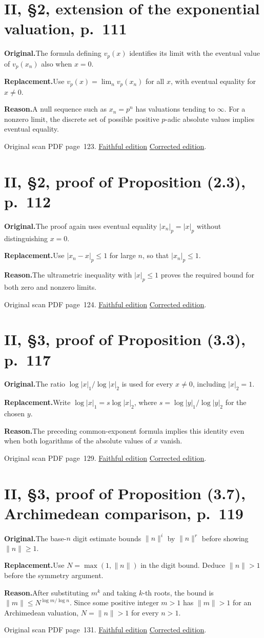 \documentclass[11pt,a4paper]{article}
\newcommand{\original}{\par\smallskip\noindent\textbf{Original.}\enspace}
\newcommand{\replacement}{\par\smallskip\noindent\textbf{Replacement.}\enspace}
\newcommand{\reason}{\par\smallskip\noindent\textbf{Reason.}\enspace}
\newcommand{\editionlink}[3]{\href{#1\#errata.#2}{#3}}
\newcommand{\location}[2]{%
  \par\smallskip\noindent Original scan PDF page~#2.\enspace
  \editionlink{Neukirch_Faithful.pdf}{#1}{Faithful edition}
  \quad\editionlink{Neukirch_Corrected.pdf}{#1}{Corrected edition}.}
\begin{document}
\section{II, \S2, extension of the exponential valuation, p.~111}\label{errata:item:72}

\original The formula defining $v_p(x)$ identifies its limit with the eventual value of $v_p(x_n)$ also when $x=0$.
\replacement Use $v_p(x)=\lim_n v_p(x_n)$ for all $x$, with eventual equality for $x\ne0$.
\reason A null sequence such as $x_n=p^n$ has valuations tending to $\infty$. For a nonzero limit, the discrete set of possible positive $p$-adic absolute values implies eventual equality.
\location{72}{123}

\setcounter{section}{72}
\section{II, \S2, proof of Proposition (2.3), p.~112}\label{errata:item:73}

\original The proof again uses eventual equality $|x_n|_p=|x|_p$ without distinguishing $x=0$.
\replacement Use $|x_n-x|_p\le1$ for large $n$, so that $|x_n|_p\le1$.
\reason The ultrametric inequality with $|x|_p\le1$ proves the required bound for both zero and nonzero limits.
\location{73}{124}

\setcounter{section}{73}
\section{II, \S3, proof of Proposition (3.3), p.~117}\label{errata:item:74}

\original The ratio $\log|x|_1/\log|x|_2$ is used for every $x\ne0$, including $|x|_2=1$.
\replacement Write $\log|x|_1=s\log|x|_2$, where $s=\log|y|_1/\log|y|_2$ for the chosen $y$.
\reason The preceding common-exponent formula implies this identity even when both logarithms of the absolute values of $x$ vanish.
\location{74}{129}

\setcounter{section}{74}
\section{II, \S3, proof of Proposition (3.7), Archimedean comparison, p.~119}\label{errata:item:75}

\original The base-$n$ digit estimate bounds $\|n\|^i$ by $\|n\|^r$ before showing $\|n\|\ge1$.
\replacement Use $N=\max(1,\|n\|)$ in the digit bound. Deduce $\|n\|>1$ before the symmetry argument.
\reason After substituting $m^k$ and taking $k$-th roots, the bound is $\|m\|\le N^{\log m/\log n}$. Since some positive integer $m>1$ has $\|m\|>1$ for an Archimedean valuation, $N=\|n\|>1$ for every $n>1$.
\location{75}{131}
\end{document}
